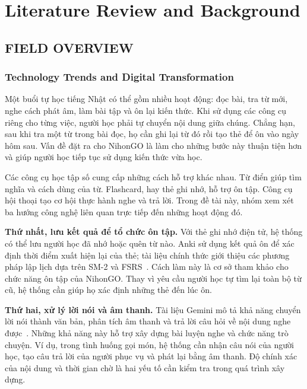 \chapter{Literature Review and Background}
\label{chap:background}

\section{FIELD OVERVIEW}

\subsection{Technology Trends and Digital Transformation}

Một buổi tự học tiếng Nhật có thể gồm nhiều hoạt động: đọc bài, tra từ mới, nghe cách phát âm, làm bài tập và ôn lại kiến thức. Khi sử dụng các công cụ riêng cho từng việc, người học phải tự chuyển nội dung giữa chúng. Chẳng hạn, sau khi tra một từ trong bài đọc, họ cần ghi lại từ đó rồi tạo thẻ để ôn vào ngày hôm sau. Vấn đề đặt ra cho NihonGO là làm cho những bước này thuận tiện hơn và giúp người học tiếp tục sử dụng kiến thức vừa học.

Các công cụ học tập số cung cấp những cách hỗ trợ khác nhau. Từ điển giúp tìm nghĩa và cách dùng của từ. Flashcard, hay thẻ ghi nhớ, hỗ trợ ôn tập. Công cụ hội thoại tạo cơ hội thực hành nghe và trả lời. Trong đề tài này, nhóm xem xét ba hướng công nghệ liên quan trực tiếp đến những hoạt động đó.

\textbf{Thứ nhất, lưu kết quả để tổ chức ôn tập.} Với thẻ ghi nhớ điện tử, hệ thống có thể lưu người học đã nhớ hoặc quên từ nào. Anki sử dụng kết quả ôn để xác định thời điểm xuất hiện lại của thẻ; tài liệu chính thức giới thiệu các phương pháp lập lịch dựa trên SM-2 và FSRS~\cite{anki-scheduler}. Cách làm này là cơ sở tham khảo cho chức năng ôn tập của NihonGO. Thay vì yêu cầu người học tự tìm lại toàn bộ từ cũ, hệ thống cần giúp họ xác định những thẻ đến lúc ôn.

\textbf{Thứ hai, xử lý lời nói và âm thanh.} Tài liệu Gemini mô tả khả năng chuyển lời nói thành văn bản, phân tích âm thanh và trả lời câu hỏi về nội dung nghe được~\cite{gemini-audio}. Những khả năng này hỗ trợ xây dựng bài luyện nghe và chức năng trò chuyện. Ví dụ, trong tình huống gọi món, hệ thống cần nhận câu nói của người học, tạo câu trả lời của người phục vụ và phát lại bằng âm thanh. Độ chính xác của nội dung và thời gian chờ là hai yếu tố cần kiểm tra trong quá trình xây dựng.

